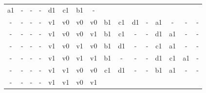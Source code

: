 \begin{table}[H]
{\begin{minipage}{\textwidth}
\begin{tabular}{cccccccccccccccc}
		\multicolumn{1}{|c}{a1} & \multicolumn{1}{c}{-} & \multicolumn{1}{c}{-}& \multicolumn{1}{c}{-} &
		\multicolumn{1}{c}{d1} &
		\multicolumn{1}{c}{c1} &
		\multicolumn{1}{c}{b1}&
		\multicolumn{1}{c}{-} \\
		\multicolumn{1}{c}{-} & \multicolumn{1}{c}{-} & \multicolumn{1}{c}{-} & \multicolumn{1}{c}{-} &
		\multicolumn{1}{c}{v1} & \multicolumn{1}{c}{v0} & \multicolumn{1}{c}{v0} & \multicolumn{1}{c}{v0} &
		\multicolumn{1}{|c}{b1} & \multicolumn{1}{c}{c1} & \multicolumn{1}{c}{d1}& \multicolumn{1}{c}{-} &
		\multicolumn{1}{c}{a1} &
		\multicolumn{1}{c}{-} &
		\multicolumn{1}{c}{-}&
		\multicolumn{1}{c}{-} \\
		\multicolumn{1}{c}{-} & \multicolumn{1}{c}{-} & \multicolumn{1}{c}{-} & \multicolumn{1}{c}{-} &
		\multicolumn{1}{c}{v1} & \multicolumn{1}{c}{v0} & \multicolumn{1}{c}{v0} & \multicolumn{1}{c}{v1} &
		\multicolumn{1}{|c}{b1} & \multicolumn{1}{c}{c1} & \multicolumn{1}{c}{-}& \multicolumn{1}{c}{-} &
		\multicolumn{1}{c}{d1} &
		\multicolumn{1}{c}{a1} &
		\multicolumn{1}{c}{-}&
		\multicolumn{1}{c}{-} \\
		\multicolumn{1}{c}{-} & \multicolumn{1}{c}{-} & \multicolumn{1}{c}{-} & \multicolumn{1}{c}{-} &
		\multicolumn{1}{c}{v1} & \multicolumn{1}{c}{v0} & \multicolumn{1}{c}{v1} & \multicolumn{1}{c}{v0} &
		\multicolumn{1}{|c}{b1} & \multicolumn{1}{c}{d1} & \multicolumn{1}{c}{-}& \multicolumn{1}{c}{-} &
		\multicolumn{1}{c}{c1} &
		\multicolumn{1}{c}{a1} &
		\multicolumn{1}{c}{-}&
		\multicolumn{1}{c}{-} \\
		\multicolumn{1}{c}{-} & \multicolumn{1}{c}{-} & \multicolumn{1}{c}{-} & \multicolumn{1}{c}{-} &
		\multicolumn{1}{c}{v1} & \multicolumn{1}{c}{v0} & \multicolumn{1}{c}{v1} & \multicolumn{1}{c}{v1} &
		\multicolumn{1}{|c}{b1} & \multicolumn{1}{c}{-} & \multicolumn{1}{c}{-}& \multicolumn{1}{c}{-} &
		\multicolumn{1}{c}{d1} &
		\multicolumn{1}{c}{c1} &
		\multicolumn{1}{c}{a1}&
		\multicolumn{1}{c}{-} \\
		\multicolumn{1}{c}{-} & \multicolumn{1}{c}{-} & \multicolumn{1}{c}{-} & \multicolumn{1}{c}{-} &
		\multicolumn{1}{c}{v1} & \multicolumn{1}{c}{v1} & \multicolumn{1}{c}{v0} & \multicolumn{1}{c}{v0} &
		\multicolumn{1}{|c}{c1} & \multicolumn{1}{c}{d1} & \multicolumn{1}{c}{-}& \multicolumn{1}{c}{-} &
		\multicolumn{1}{c}{b1} &
		\multicolumn{1}{c}{a1} &
		\multicolumn{1}{c}{-}&
		\multicolumn{1}{c}{-} \\
		\multicolumn{1}{c}{-} & \multicolumn{1}{c}{-} & \multicolumn{1}{c}{-} & \multicolumn{1}{c}{-} &
		\multicolumn{1}{c}{v1} & \multicolumn{1}{c}{v1} & \multicolumn{1}{c}{v0} & \multicolumn{1}{c}{v1} &

\end{tabular}
\end{minipage}}
\end{table}
